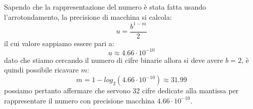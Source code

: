 Sapendo che la rappresentazione del numero è stata fatta usando l'arrotondamento, la precisione di macchina si calcola:
\[
u = \frac{b^{1-m}}{2}
\]
il cui valore sappiamo essere pari a:
\[
u \approx 4.66 \cdot 10^{-10}
\]
dato che stiamo cercando il numero di cifre binarie allora si deve avere $b=2$, è quindi possibile ricavare $m$:
\[
m = 1- log_2{(4.66 \cdot 10 ^{-10})} \approx 31.99
\]
possiamo pertanto affermare che servono 32 cifre dedicate alla mantissa per rappresentare il numero con precisione macchina \(4.66 \cdot 10^{-10}\).